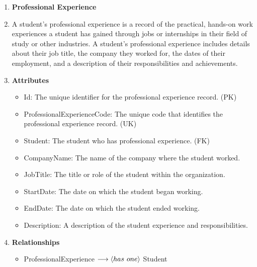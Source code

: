 \documentclass[12pt]{article}
\begin{document}
\begin{appendices}
\begin{enumerate}[label=(\roman*)]
    \item \textbf{Professional Experience}
    \item[] A student's professional experience is a record of the practical, hands-on work experiences a student has gained through jobs or internships in their field of study or other industries. A student's professional experience includes details about their job title, the company they worked for, the dates of their employment, and a description of their responsibilities and achievements.
    \item[] \textbf{Attributes}
    \begin{itemize}
        \item Id: The unique identifier for the professional experience record. (PK)
        \item ProfessionalExperienceCode: The unique code that identifies the professional experience record. (UK)
        \item Student: The student who has professional experience. (FK)
        \item CompanyName: The name of the company where the student worked.
        \item JobTitle: The title or role of the student within the organization.
        \item StartDate: The date on which the student began working.
        \item EndDate: The date on which the student ended working.
        \item Description: A description of the student experience and responsibilities.
    \end{itemize}
    \item[] \textbf{Relationships}
    \begin{itemize}
        \item ProfessionalExperience $ \longrightarrow \langle has \hspace{0.125cm} one \rangle $ Student
    \end{itemize}


\end{enumerate}
\end{appendices}
\end{document}
